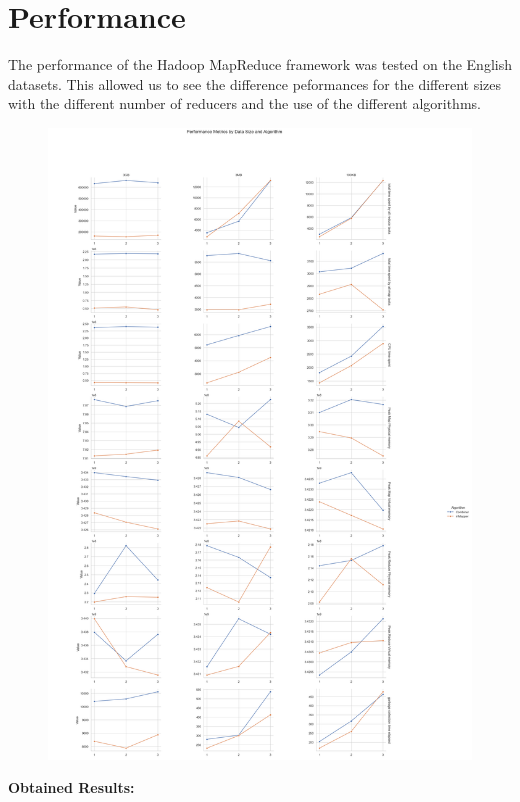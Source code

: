 \section{Performance}
The performance of the Hadoop MapReduce framework was tested on the English datasets. This allowed us to see the difference peformances for the different sizes with the different number of reducers and the use of the different algorithms.
\begin{figure}[h]
    \centering
    \includegraphics[width=1\textwidth]{media/performance_graph_cut.png}
\end{figure}

\textbf{Obtained Results:}
